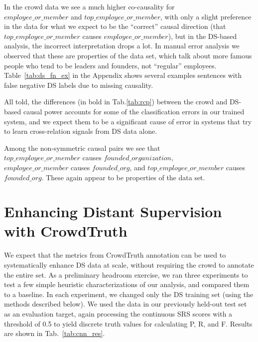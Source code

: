 In the crowd data we see a much higher co-causality for \\ $employee\_or\_member$ and $top\_employee\_or\_member$, with only a slight preference in the data for what we expect to be the ``correct'' causal direction (that $top\_employee\_or\_member$ causes $employee\_or\_member$), but in the DS-based analysis, the incorrect interpretation drops a lot. In manual error analysis we observed that these are properties of the data set, which talk about more famous people who tend to be leaders and founders, not ``regular'' employees.  Table~\ref{tab:ds_fn_ex} in the Appendix shows several examples sentences with false negative DS labels due to missing causality.

All told, the differences (in bold in Tab.\ref{tab:rcp}) between the crowd and DS-based causal power accounts for some of the classification errors in our trained system, and we expect them to be a significant cause of error in systems that try to learn cross-relation signals from DS data alone.

Among the non-symmetric causal pairs we see that \\ $top\_employee\_or\_member$ causes $founded\_organization$, \\ $employee\_or\_member$ causes $founded\_org$, and $top\_employee\_or\_member$ causes $founded\_org$.  These again appear to be properties of the data set.


\section{Enhancing Distant Supervision with CrowdTruth}
We expect that the metrics from CrowdTruth annotation can be used to systematically enhance DS data at scale, without requiring the crowd to annotate the entire set.  As a preliminary headroom exercise, we ran three experiments to test a few simple heuristic characterizations of our analysis, and compared them to a baseline.  In each experiment, we changed only the DS training set (using the methods described below).  We used the data in our previously held-out test set as an evaluation target, again processing the continuous SRS scores with a threshold of 0.5 to yield discrete truth values for calculating P, R, and F.  Results are shown in Tab.~\ref{tab:cnn_res}.

